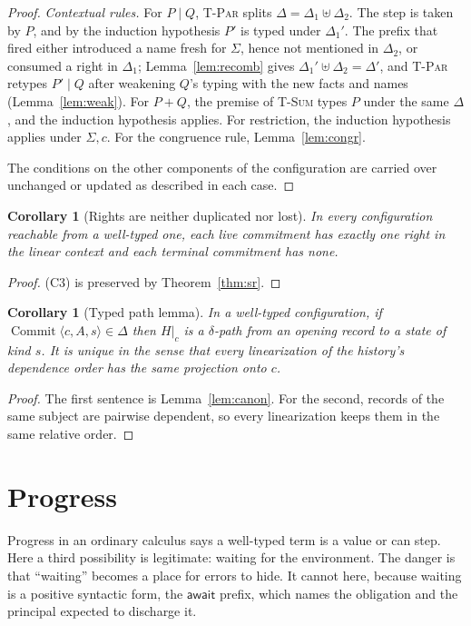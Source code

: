 \documentclass[11pt,openany]{book}
\newtheorem{corollary}[theorem]{Corollary}
\theoremstyle{remark}
\newcommand{\Commit}{\operatorname{Commit}}
\begin{document}
\begin{proof}
\emph{Contextual rules.} For $P\mid Q$, \textsc{T-Par} splits
$\Delta=\Delta_1\uplus\Delta_2$. The step is taken by $P$, and by the
induction hypothesis $P'$ is typed under $\Delta_1'$. The prefix that
fired either introduced a name fresh for $\Sigma$, hence not mentioned in
$\Delta_2$, or consumed a right in $\Delta_1$; Lemma~\ref{lem:recomb}
gives $\Delta_1'\uplus\Delta_2=\Delta'$, and \textsc{T-Par} retypes
$P'\mid Q$ after weakening $Q$'s typing with the new facts and names
(Lemma~\ref{lem:weak}). For $P+Q$, the premise of \textsc{T-Sum} types $P$
under the same $\Delta$, and the induction hypothesis applies. For
restriction, the induction hypothesis applies under $\Sigma,c$. For the
congruence rule, Lemma~\ref{lem:congr}.

The conditions on the other components of the configuration are carried
over unchanged or updated as described in each case.
\end{proof}

\begin{corollary}[Rights are neither duplicated nor lost]
In every configuration reachable from a well-typed one, each live
commitment has exactly one right in the linear context and each terminal
commitment has none.
\end{corollary}

\begin{proof}
(C3) is preserved by Theorem~\ref{thm:sr}.
\end{proof}

\begin{corollary}[Typed path lemma]
In a well-typed configuration, if $\Commit\langle c,A,s\rangle\in\Delta$
then $H|_c$ is a $\delta$-path from an opening record to a state of kind
$s$. It is unique in the sense that every linearization of the history's
dependence order has the same projection onto $c$.
\end{corollary}

\begin{proof}
The first sentence is Lemma~\ref{lem:canon}. For the second, records of
the same subject are pairwise dependent, so every linearization keeps
them in the same relative order.
\end{proof}

\section{Progress}

Progress in an ordinary calculus says a well-typed term is a value or can
step. Here a third possibility is legitimate: waiting for the environment.
The danger is that ``waiting'' becomes a place for errors to hide. It
cannot here, because waiting is a positive syntactic form, the
$\mathsf{await}$ prefix, which names the obligation and the principal
expected to discharge it.
\end{document}
